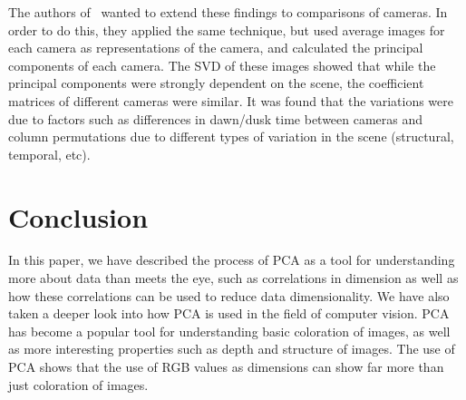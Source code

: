 \documentclass[11pt]{article}
\begin{document}
The authors of~\cite{many-outdoor-scenes} wanted to extend these findings to comparisons of cameras. In order to do this, they applied the same technique, but used average images for each camera as representations of the camera, and calculated the principal components of each camera. The SVD of these images showed that while the principal components were strongly dependent on the scene, the coefficient matrices of different cameras were similar. It was found that the variations were due to factors such as differences in dawn/dusk time between cameras and column permutations due to different types of variation in the scene (structural, temporal, etc). 

\section{Conclusion}
In this paper, we have described the process of PCA as a tool for understanding more about data than meets the eye, such as correlations in dimension as well as how these correlations can be used to reduce data dimensionality. We have also taken a deeper look into how PCA is used in the field of computer vision. PCA has become a popular tool for understanding basic coloration of images, as well as more interesting properties such as depth and structure of images. The use of PCA shows that the use of RGB values as dimensions can show far more than just coloration of images. 



\end{document}
